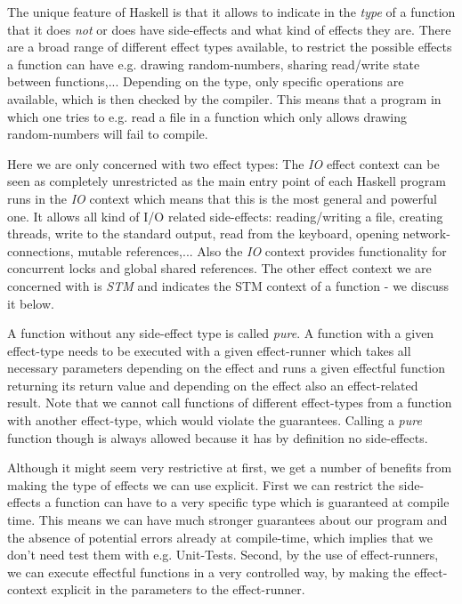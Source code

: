 The unique feature of Haskell is that it allows to indicate in the \textit{type} of a function that it does \textit{not} or does have side-effects and what kind of effects they are. There are a broad range of different effect types available, to restrict the possible effects a function can have e.g. drawing random-numbers, sharing read/write state between functions,... Depending on the type, only specific operations are available, which is then checked by the compiler. This means that a program in which one tries to e.g. read a file in a function which only allows drawing random-numbers will fail to compile.

Here we are only concerned with two effect types: The \textit{IO} effect context can be seen as completely unrestricted as the main entry point of each Haskell program runs in the \textit{IO} context which means that this is the most general and powerful one. It allows all kind of I/O related side-effects: reading/writing a file, creating threads, write to the standard output, read from the keyboard, opening network-connections, mutable references,... Also the \textit{IO} context provides functionality for concurrent locks and global shared references. The other effect context we are concerned with is \textit{STM} and indicates the STM context of a function - we discuss it below. 

A function without any side-effect type is called \textit{pure}. A function with a given effect-type needs to be executed with a given effect-runner which takes all necessary parameters depending on the effect and runs a given effectful function returning its return value and depending on the effect also an effect-related result. Note that we cannot call functions of different effect-types from a function with another effect-type, which would violate the guarantees. Calling a \textit{pure} function though is always allowed because it has by definition no side-effects. 

Although it might seem very restrictive at first, we get a number of benefits from making the type of effects we can use explicit. First we can restrict the side-effects a function can have to a very specific type which is guaranteed at compile time. This means we can have much stronger guarantees about our program and the absence of potential errors already at compile-time, which implies that we don't need test them with e.g. Unit-Tests. Second, by the use of effect-runners, we can execute effectful functions in a very controlled way, by making the effect-context explicit in the parameters to the effect-runner.

